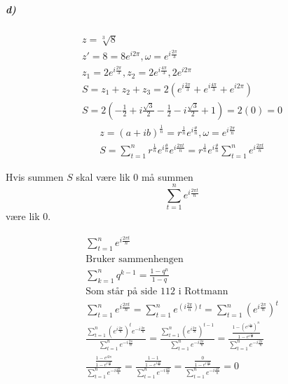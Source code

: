 \documentclass[11pt, A4paper, norsk]{article}
\begin{document}
			\subparagraph{d)}
				\begin{gather}
z = \sqrt[3]{8} \\
z' = 8 = 8 e^{i 2\pi} , \omega = e^{i \frac{2\pi}{3}} \\
z_1 = 2 e^{i \frac{2\pi}{3}}, z_2 = 2 e^{i \frac{4\pi}{3}}, 2 e^{i 2\pi} \\
S = z_1 + z_2 + z_3 = 2 \left( e^{i \frac{2\pi}{3}} + e^{i \frac{4\pi}{3}} + e^{i 2\pi} \right) \\
S = 2 \left( -\frac{1}{2} + i \frac{\sqrt{3}}{2} -\frac{1}{2} - i \frac{\sqrt{3}}{2} + 1 \right) = 2(0) = 0
				\end{gather}
				\begin{gather}
z = (a + ib)^{\frac{1}{n}} = r^{\frac{1}{n}} e^{i \frac{\theta}{n}}, \omega = e^{i \frac{2\pi}{n}} \\
S = \sum_{t = 1}^{n} r^{\frac{1}{n}} e^{i \frac{\theta}{n}} e^{i \frac{2\pi t}{n}} = r^{\frac{1}{n}} e^{i \frac{\theta}{n}} \sum_{t = 1}^{n} e^{i \frac{2\pi t}{n}}
				\end{gather}
				\begin{flushleft}
Hvis summen $S$ skal være lik $0$ må summen $$\sum_{t = 1}^{n} e^{i \frac{2\pi t}{n}}$$ være lik $0$. \\
				\end{flushleft}
				\begin{gather}
\sum_{t = 1}^{n} e^{i \frac{2\pi t}{n}} \\
\text{Bruker sammenhengen} \nonumber \\
\sum_{k = 1}^{n} q^{k - 1} = \frac{1 - q^{n}}{1 - q} \\
\text{Som står på side $112$ i Rottmann} \nonumber \\
\sum_{t = 1}^{n} e^{i \frac{2\pi t}{n}} = \sum_{t = 1}^{n} e^{\left(i \frac{2\pi}{n}\right)t} = \sum_{t = 1}^{n} \left(e^{i \frac{2\pi}{n}}\right)^{t} \\
\frac{\sum_{t = 1}^{n} \left(e^{i \frac{2\pi}{n}}\right)^{t} e^{- i \frac{2\pi}{n}}}{\sum_{t = 1}^{n} e^{- i \frac{2\pi}{n}}} = \frac{\sum_{t = 1}^{n} \left(e^{i \frac{2\pi}{n}}\right)^{t - 1}}{\sum_{t = 1}^{n} e^{- i \frac{2\pi}{n}}} = \frac{\frac{1 - \left(e^{i \frac{2\pi}{n}}\right)^{n}}{1 - e^{i \frac{2\pi}{n}}}}{\sum_{t = 1}^{n} e^{- i \frac{2\pi}{n}}} \\
\frac{\frac{1 - e^{i 2\pi}}{1 - e^{i \frac{2\pi}{n}}}}{\sum_{t = 1}^{n} e^{- i \frac{2\pi}{n}}} = \frac{\frac{1 - 1}{1 - e^{i \frac{2\pi}{n}}}}{\sum_{t = 1}^{n} e^{- i \frac{2\pi}{n}}} = \frac{\frac{0}{1 - e^{i \frac{2\pi}{n}}}}{\sum_{t = 1}^{n} e^{- i \frac{2\pi}{n}}} = 0
				\end{gather}
\end{document}
